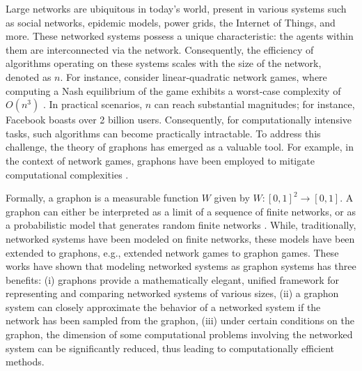 \documentclass[11pt]{article}
\newcommand{\<}{\langle}
\renewcommand{\>}{\rangle}
\theoremstyle{plain}
\theoremstyle{definition}
\theoremstyle{remark}
\begin{document}
Large networks are ubiquitous in today's world, present in various systems such as social networks, epidemic models, power grids, the Internet of Things, and more. These networked systems possess a unique characteristic: the agents within them are interconnected via the network. Consequently, the efficiency of algorithms operating on these systems scales with the size of the network, denoted as $n$.
For instance, consider linear-quadratic network games, where computing a Nash equilibrium of the game exhibits a worst-case complexity of $O(n^3)$ \citep{galeotti_interventions}. In practical scenarios,  $n$  can reach substantial magnitudes; for instance, Facebook boasts over 2 billion users. Consequently, for computationally intensive tasks, such algorithms can become practically intractable.
To address this challenge, the theory of graphons has emerged as a valuable tool. For example, in the context of network games, graphons have been employed to mitigate computational complexities \citep{Parise_Ozdaglar_Econometrica}. 


Formally, a graphon is a measurable function $W$ given by $W : [0,1]^2 \rightarrow [0,1]$. A graphon can either be interpreted as a limit of a sequence of finite networks, or as a probabilistic model that generates random finite networks \citep{lovasz}. While, traditionally, networked systems   have been modeled on finite networks, these models have been extended to graphons, e.g., \citep{Parise_Ozdaglar_Econometrica} extended network games to graphon games. These works have shown that modeling networked systems as graphon systems has three benefits: (i) graphons provide a mathematically elegant, unified framework for representing and comparing networked systems of various sizes, (ii) a graphon system can closely approximate the behavior of a networked system if the network has been sampled from the graphon, (iii) under certain conditions on the graphon, the dimension of some computational problems involving the networked system can be significantly reduced, thus leading to computationally efficient methods. 
\end{document}
